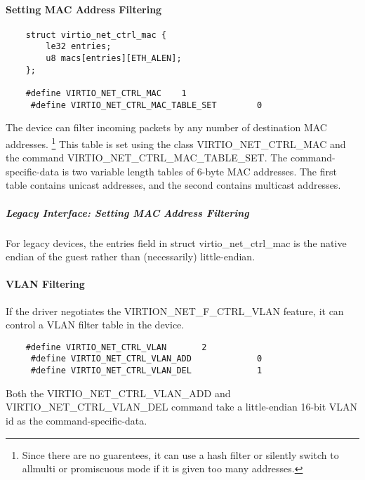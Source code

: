 \paragraph{Setting MAC Address Filtering}\label{sec:Device Types / Network Device / Device Operation / Control Virtqueue / Setting MAC Address Filtering}

\begin{lstlisting}
	struct virtio_net_ctrl_mac {
		le32 entries;
		u8 macs[entries][ETH_ALEN];
	};

	#define VIRTIO_NET_CTRL_MAC    1
	 #define VIRTIO_NET_CTRL_MAC_TABLE_SET        0
\end{lstlisting}

The device can filter incoming packets by any number of destination
MAC addresses.
\footnote{Since there are no guarentees, it can use a hash filter or
silently switch to allmulti or promiscuous mode if it is given too
many addresses.
} This table is set using the class
VIRTIO_NET_CTRL_MAC and the command VIRTIO_NET_CTRL_MAC_TABLE_SET. The
command-specific-data is two variable length tables of 6-byte MAC
addresses. The first table contains unicast addresses, and the second
contains multicast addresses.

\subparagraph{Legacy Interface: Setting MAC Address Filtering}\label{sec:Device Types / Network Device / Device Operation / Control Virtqueue / Setting MAC Address Filtering / Legacy Interface: Setting MAC Address Filtering}
For legacy devices, the entries field in struct virtio_net_ctrl_mac is the
native endian of the guest rather than (necessarily) little-endian.

\paragraph{VLAN Filtering}\label{sec:Device Types / Network Device / Device Operation / Control Virtqueue / VLAN Filtering}

If the driver negotiates the VIRTION_NET_F_CTRL_VLAN feature, it
can control a VLAN filter table in the device.

\begin{lstlisting}
	#define VIRTIO_NET_CTRL_VLAN       2
	 #define VIRTIO_NET_CTRL_VLAN_ADD             0
	 #define VIRTIO_NET_CTRL_VLAN_DEL             1
\end{lstlisting}

Both the VIRTIO_NET_CTRL_VLAN_ADD and VIRTIO_NET_CTRL_VLAN_DEL
command take a little-endian 16-bit VLAN id as the command-specific-data.

